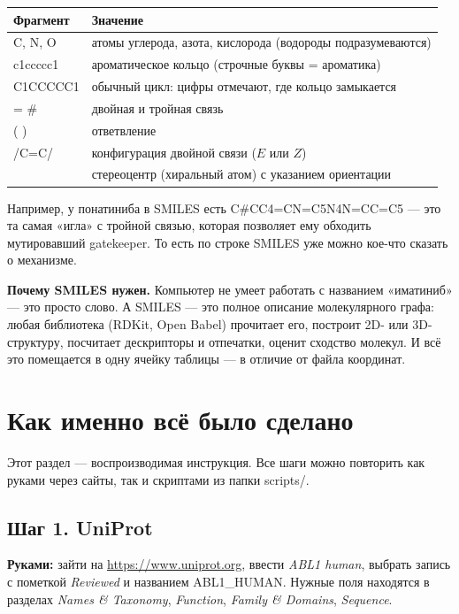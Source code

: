 \documentclass[11pt,a4paper]{article}
\newcommand{\code}[1]{{\ttfamily #1}}
\begin{document}
\begin{center}
\small
\begin{tabular}{L{3.2cm}L{11.4cm}}
\toprule
\textbf{Фрагмент} & \textbf{Значение} \\
\midrule
\code{C}, \code{N}, \code{O} & атомы углерода, азота, кислорода (водороды подразумеваются) \\
\code{c1ccccc1} & ароматическое кольцо (строчные буквы = ароматика) \\
\code{C1CCCCC1} & обычный цикл: цифры отмечают, где кольцо замыкается \\
\code{=} \code{\#} & двойная и тройная связь \\
\code{( )} & ответвление \\
\code{/C=C/} & конфигурация двойной связи ($E$ или $Z$) \\
\code{[C@@H]} & стереоцентр (хиральный атом) с указанием ориентации \\
\bottomrule
\end{tabular}
\end{center}

Например, у понатиниба в SMILES есть \code{C\#CC4=CN=C5N4N=CC=C5} --- это та самая
«игла» с тройной связью, которая позволяет ему обходить мутировавший gatekeeper.
То есть по строке SMILES уже можно кое-что сказать о механизме.

\textbf{Почему SMILES нужен.} Компьютер не умеет работать с названием «иматиниб» ---
это просто слово. А SMILES --- это полное описание молекулярного графа: любая
библиотека (RDKit, Open Babel) прочитает его, построит 2D- или 3D-структуру,
посчитает дескрипторы и отпечатки, оценит сходство молекул. И всё это помещается
в одну ячейку таблицы --- в отличие от файла координат.

\section{Как именно всё было сделано}
\label{sec:howto}

Этот раздел --- воспроизводимая инструкция. Все шаги можно повторить как руками
через сайты, так и скриптами из папки \code{scripts/}.

\subsection{Шаг 1. UniProt}

\textbf{Руками:} зайти на \url{https://www.uniprot.org}, ввести \emph{ABL1 human},
выбрать запись с пометкой \emph{Reviewed} и названием \code{ABL1\_HUMAN}. Нужные
поля находятся в разделах \emph{Names \& Taxonomy}, \emph{Function},
\emph{Family \& Domains}, \emph{Sequence}.
\end{document}

